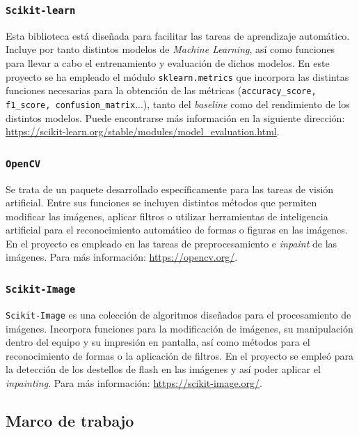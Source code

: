 \subsubsection{\texttt{Scikit-learn}}

Esta biblioteca está diseñada para facilitar las tareas de aprendizaje automático. Incluye por tanto distintos modelos de \textit{Machine Learning}, así como funciones para llevar a cabo el entrenamiento y evaluación de dichos modelos. En este proyecto se ha empleado el módulo \texttt{sklearn.metrics} que incorpora las distintas funciones necesarias para la obtención de las métricas (\texttt{accuracy\_score, f1\_score, confusion\_matrix}...), tanto del \textit{baseline} como del rendimiento de los distintos modelos. Puede encontrarse más información en la siguiente dirección: \url{https://scikit-learn.org/stable/modules/model_evaluation.html}.

\subsubsection{\texttt{OpenCV}}

Se trata de un paquete desarrollado específicamente para las tareas de visión artificial. Entre sus funciones se incluyen distintos métodos que permiten modificar las imágenes, aplicar filtros o utilizar herramientas de inteligencia artificial para el reconocimiento automático de formas o figuras en las imágenes. En el proyecto es empleado en las tareas de preprocesamiento e \textit{inpaint} de las imágenes. Para más información: \url{https://opencv.org/}.

\subsubsection{\texttt{Scikit-Image}}

\texttt{Scikit-Image} es una colección de algoritmos diseñados para el procesamiento de imágenes. Incorpora funciones para la modificación de imágenes, su manipulación dentro del equipo y su impresión en pantalla, así como métodos para el reconocimiento de formas o la aplicación de filtros. En el proyecto se empleó para la detección de los destellos de flash en las imágenes y así poder aplicar el \textit{inpainting}. Para más información: \url{https://scikit-image.org/}.

\subsection{Marco de trabajo}

